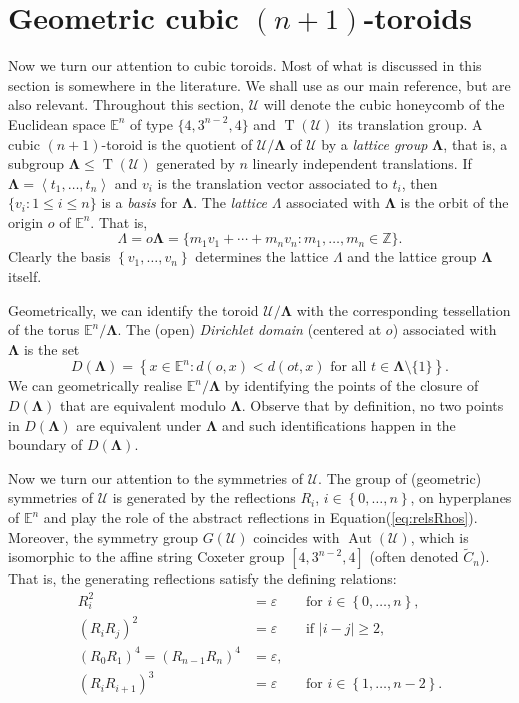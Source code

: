 \documentclass[final]{amsart}
\theoremstyle{plain}
\theoremstyle{definition}
\theoremstyle{remark}
\numberwithin{equation}{section}
\renewcommand{\leq}{\leqslant} \renewcommand{\geq}{\geqslant}
\renewcommand{\{}{\lbrace}
\renewcommand{\}}{\rbrace}
\newcommand{\sm}{\setminus}
\newcommand{\bE}{\mathbb{E}}
\newcommand{\bZ}{\mathbb{Z}}
\newcommand{\cU}{\mathcal{U}}
\newcommand{\LL}{\Lambda}
\newcommand{\bLL}{\mathbf{\Lambda}}
\newcommand{\id}{\varepsilon}
\DeclareMathOperator{\aut}{Aut} \DeclareMathOperator{\autp}{\aut^{+}}
\DeclareMathOperator{\tras}{T}
\newcommand{\typetor}[1][n-2]{\{4,3^{#1},4\}}
\newcommand{\E}[1][n]{\bE^{#1}}
\newcommand{\UoverL}{\cU/\bLL}
\begin{document}
\section{Geometric cubic $(n+1)$-toroids}
Now we turn our attention to cubic toroids. Most of what is discussed in this section is somewhere in the literature. We shall use \cite[Sections 6A and 6D]{McMullenSchulte_2002_AbstractRegularPolytopes} as our main reference, but \cite{CollinsMontero_2021_EquivelarToroidsFew,HubardOrbanicPellicerWeiss_2012_SymmetriesEquivelar4} are also relevant.
Throughout this section, $\cU$ will denote the cubic honeycomb of the Euclidean space $\bE^{n}$ of type $\typetor$ and $\tras(\cU)$ its translation group. 
A cubic $(n+1)$-toroid is the quotient of $\UoverL$ of $\cU$ by a \emph{lattice group} $\bLL$, that is, a subgroup $\bLL \leq \tras(\cU)$ generated by $n$ linearly independent translations. 
If $\bLL = \left\langle t_{1}, \dots, t_{n} \right\rangle$ and $v_{i}$ is the translation vector associated to $t_{i}$, then  $\{v_{i} : 1 \leq i \leq n \}$ is a \emph{basis} for $\bLL$.
The \emph{lattice} $\LL$ associated with $\bLL$ is the orbit of the origin $o$ of $\E$. That is,
\[\LL= o\bLL = \{m_1 v_1 + \cdots + m_n v_n : m_1, \dots, m_n \in \bZ \}.\]
Clearly the basis $\left\{ v_{1}, \dots, v_{n} \right\}$ determines the lattice  $\LL$ and the lattice group $\bLL$ itself.

Geometrically, we can identify the toroid $\UoverL$ with the corresponding tessellation of the torus $\E/\bLL$.
The (open) \emph{Dirichlet domain} (centered at $o$) associated with $\bLL$ is the set \[ D(\bLL) = \left\{ x \in \E : d(o,x) < d(o t, x) \text{ for all } t \in \bLL\sm \{1\} \right\}. \]
We can geometrically realise $\E/\bLL$ by identifying the points of the closure of $D(\bLL)$ that are equivalent modulo $\bLL$.
Observe that by definition, no two points in $D(\bLL)$ are equivalent under $\bLL$ and such identifications happen in the boundary of $D(\bLL)$.

Now we turn our attention to the symmetries of $\cU$. 
The group of (geometric) symmetries of $\cU$ is generated by the reflections $R_i$, $i\in \left\{ 0, \dots, n \right\}$, on hyperplanes of $\E$ and play the role of the abstract reflections in Equation\nobreakspace \textup {(\ref {eq:relsRhos})}. 
Moreover, the symmetry group $G(\cU)$ coincides with $\aut(\cU)$, which is isomorphic to the affine string Coxeter group $[4, 3^{n-2}, 4]$ (often denoted $\tilde{C}_{n}$). That is, the generating reflections satisfy the defining relations:
\begin{equation}\label{eq:relsRrefCubes}
	\begin{aligned} 
		R_{i}^{2} &= \id && \text{for } i \in \left\{ 0, \dots, n \right\} ,\\
		\left( R_{i} R_{j} \right)^{2} &= \id && \text{if } |i-j| \geq 2, \\
		\left( R_{0} R_{1}\right)^{4} = \left( R_{n-1} R_{n}\right)^{4} &= \id, \\
		\left( R_{i} R_{i+1}\right)^{3} &= \id && \text{for } i \in \left\{ 1, \dots, n-2 \right\}. 
	\end{aligned}
\end{equation}
\end{document}

